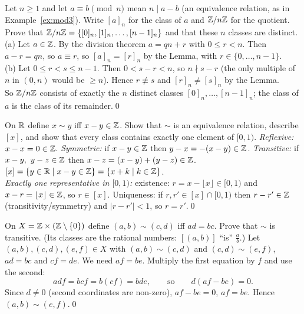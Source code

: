 \begin{hexample}\label{ex:znz}
Let $n\ge1$ and let $a\equiv b\pmod n$ mean $n\mid a-b$ (an equivalence relation, as in Example~\ref{ex:mod3}). Write $[a]_n$ for the class of $a$ and $\mathbb{Z}/n\mathbb{Z}$ for the quotient. Prove that $\mathbb{Z}/n\mathbb{Z}=\{[0]_n,[1]_n,\dots,[n-1]_n\}$ and that these $n$ classes are distinct.
\solution
(a) Let $a\in\mathbb{Z}$. By the division theorem $a=qn+r$ with $0\le r<n$. Then $a-r=qn$, so $a\equiv r$, so $[a]_n=[r]_n$ by the Lemma, with $r\in\{0,\dots,n-1\}$.\\
(b) Let $0\le r<s\le n-1$. Then $0<s-r<n$, so $n\nmid s-r$ (the only multiple of $n$ in $(0,n)$ would be $\ge n$). Hence $r\not\equiv s$ and $[r]_n\neq[s]_n$ by the Lemma.\\
So $\mathbb{Z}/n\mathbb{Z}$ consists of exactly the $n$ distinct classes $[0]_n,\dots,[n-1]_n$; the class of $a$ is the class of its remainder.\qed
\end{hexample}

\begin{hexample}
On $\mathbb{R}$ define $x\sim y$ iff $x-y\in\mathbb{Z}$. Show that $\sim$ is an equivalence relation, describe $[x]$, and show that every class contains exactly one element of $[0,1)$.
\solution
\emph{Reflexive:} $x-x=0\in\mathbb{Z}$. \emph{Symmetric:} if $x-y\in\mathbb{Z}$ then $y-x=-(x-y)\in\mathbb{Z}$. \emph{Transitive:} if $x-y,\ y-z\in\mathbb{Z}$ then $x-z=(x-y)+(y-z)\in\mathbb{Z}$.\\
$[x]=\{y\in\mathbb{R}\mid x-y\in\mathbb{Z}\}=\{x+k\mid k\in\mathbb{Z}\}$.\\
\emph{Exactly one representative in $[0,1)$:} existence: $r=x-\lfloor x\rfloor\in[0,1)$ and $x-r=\lfloor x\rfloor\in\mathbb{Z}$, so $r\in[x]$. Uniqueness: if $r,r'\in[x]\cap[0,1)$ then $r-r'\in\mathbb{Z}$ (transitivity/symmetry) and $|r-r'|<1$, so $r=r'$.\qed
\end{hexample}

\begin{hexample}
On $X=\mathbb{Z}\times(\mathbb{Z}\setminus\{0\})$ define $(a,b)\sim(c,d)$ iff $ad=bc$. Prove that $\sim$ is transitive. (Its classes are the rational numbers: $[(a,b)]$ ``is'' $\frac ab$.)
\solution
Let $(a,b),(c,d),(e,f)\in X$ with $(a,b)\sim(c,d)$ and $(c,d)\sim(e,f)$, \ie $ad=bc$ and $cf=de$. We need $af=be$. Multiply the first equation by $f$ and use the second:
\[
adf=bcf=b(cf)=bde,\qquad\text{so}\qquad d(af-be)=0 .
\]
Since $d\neq0$ (second coordinates are non-zero), $af-be=0$, \ie $af=be$. Hence $(a,b)\sim(e,f)$.\qed
\end{hexample}

